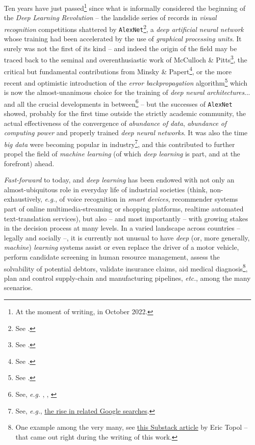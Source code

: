 

Ten years have just passed\footnote{At the moment of writing, in October 2022.} since what is informally considered the beginning of the \textit{Deep Learning Revolution} -- the landslide series of records in \textit{visual recognition} competitions shattered by \texttt{AlexNet}\footnote{See \cite{KrizhevskyEtAl2012AlexNet}.}, a \textit{deep artificial neural network} whose training had been accelerated by the use of \textit{graphical processing units}. It surely was not the first of its kind -- and indeed the origin of the field may be traced back to the seminal and overenthusiastic work of McCulloch \& Pitts\footnote{See \cite{McCullochPitts1990ALC}.}, the critical but fundamental contributions from Minsky \& Papert\footnote{See \cite{MinskyPapert1969Perceptrons}.}, or the more recent and optimistic introduction of the \textit{error backpropagation} algorithm\footnote{See \cite{RumelhartEtAl1986LearningRB}.} which is now the almost-unanimous choice for the training of \textit{deep neural architectures}... and all the crucial developments in between\footnote{See, \textit{e.g.} \cite{Hebb1949Organization}, \cite{Rosenblatt1958ThePA}, \cite{Hopfield1982Neural}} -- but the successes of \texttt{AlexNet} showed, probably for the first time outside the strictly academic community, the actual effectiveness of the convergence of \textit{abundance of data}, \textit{abundance of computing power} and properly trained \textit{deep neural networks}. It was also the time \textit{big data} were becoming popular in industry\footnote{See, \textit{e.g.}, \href{https://trends.google.com/trends/explore?date=all\&q=big\%20data,Deep\%20learning}{the rise in related Google searches}.}, and this contributed to further propel the field of \textit{machine learning} (of which \textit{deep learning} is part, and at the forefront) ahead.

\textit{Fast-forward} to today, and \textit{deep learning} has been endowed with not only an almost-ubiquitous role in everyday life of industrial societies (think, non-exhaustively, \textit{e.g.}, of voice recognition in \textit{smart devices}, recommender systems part of online multimedia-streaming or shopping platforms, realtime automated text-translation services), but also -- and most importantly -- with growing stakes in the decision process at many levels. In a varied landscape across countries -- legally and socially --, it is currently not unusual to have \textit{deep} (or, more generally, \textit{machine}) \textit{learning} systems assist or even replace the driver of a motor vehicle, perform candidate screening in human resource management, assess the solvability of potential debtors, validate insurance claims, aid medical diagnosis\footnote{One example among the very many, see \href{https://erictopol.substack.com/p/the-amazing-power-of-machine-eyes}{this Substack article} by Eric Topol -- that came out right during the writing of this work.}, plan and control supply-chain and manufacturing pipelines, \textit{etc.}, among the many scenarios.

